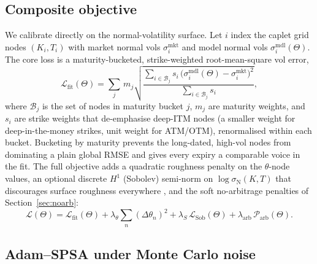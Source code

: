 \documentclass[11pt]{article}
\newcommand{\Nvol}{\sigma_{\mathrm N}}
\newcommand{\Nmkt}{\sigma^{\mathrm{mkt}}}
\newcommand{\Nmdl}{\sigma^{\mathrm{mdl}}}
\theoremstyle{plain}
\theoremstyle{definition}
\begin{document}
\subsection{Composite objective}

We calibrate directly on the normal-volatility surface. Let $i$ index the caplet
grid nodes $(K_i, T_i)$ with market normal vols $\Nmkt_i$ and
model normal vols $\Nmdl_i(\Theta)$. The core loss is a
maturity-bucketed, strike-weighted root-mean-square vol error,
\begin{equation}
\mathcal L_{\mathrm{fit}}(\Theta)
   = \sum_{j}\, m_j \sqrt{
       \frac{\sum_{i\in \mathcal B_j} s_i\,
            \bigl(\Nmdl_i(\Theta) - \Nmkt_i\bigr)^2}
            {\sum_{i\in \mathcal B_j} s_i}},
\label{eq:coreloss}
\end{equation}
where $\mathcal B_j$ is the set of nodes in maturity bucket $j$, $m_j$ are
maturity weights, and $s_i$ are strike weights that de-emphasise deep-ITM nodes
(a smaller weight for deep-in-the-money strikes, unit weight for ATM/OTM),
renormalised within each bucket. Bucketing by maturity prevents the long-dated,
high-vol nodes from dominating a plain global RMSE and gives every expiry a
comparable voice in the fit. The full objective adds a quadratic
roughness penalty on the $\theta$-node values, an optional discrete $H^1$
(Sobolev) semi-norm on $\log\Nvol(K,T)$ that discourages surface roughness
everywhere \citep{Gatheral2006}, and the soft no-arbitrage penalties of
Section~\ref{sec:noarb}:
\begin{equation}
\mathcal L(\Theta) = \mathcal L_{\mathrm{fit}}(\Theta)
   + \lambda_\theta \sum_n (\Delta\theta_n)^2
   + \lambda_S\, \mathcal L_{\mathrm{Sob}}(\Theta)
   + \lambda_{\mathrm{arb}}\, \mathcal P_{\mathrm{arb}}(\Theta).
\label{eq:totalloss}
\end{equation}

\subsection{Adam--SPSA under Monte Carlo noise}
\end{document}

